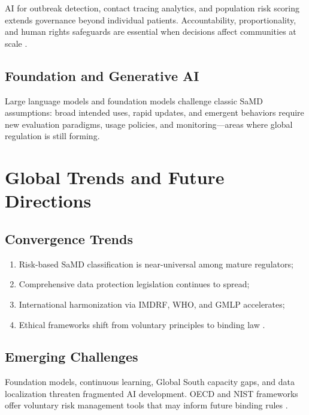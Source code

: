\documentclass[12pt,a4paper]{report}
\begin{document}
AI for outbreak detection, contact tracing analytics, and population risk scoring extends governance beyond individual patients. Accountability, proportionality, and human rights safeguards are essential when decisions affect communities at scale \cite{who2021}.

\section{Foundation and Generative AI}

Large language models and foundation models challenge classic SaMD assumptions: broad intended uses, rapid updates, and emergent behaviors require new evaluation paradigms, usage policies, and monitoring---areas where global regulation is still forming.

\chapter{Global Trends and Future Directions}

\section{Convergence Trends}

\begin{enumerate}[noitemsep]
  \item Risk-based SaMD classification is near-universal among mature regulators;
  \item Comprehensive data protection legislation continues to spread;
  \item International harmonization via IMDRF, WHO, and GMLP accelerates;
  \item Ethical frameworks shift from voluntary principles to binding law \cite{euaiact2024}.
\end{enumerate}

\section{Emerging Challenges}

Foundation models, continuous learning, Global South capacity gaps, and data localization threaten fragmented AI development. OECD and NIST frameworks offer voluntary risk management tools that may inform future binding rules \cite{oecdai,nistairmf}.
\end{document}
